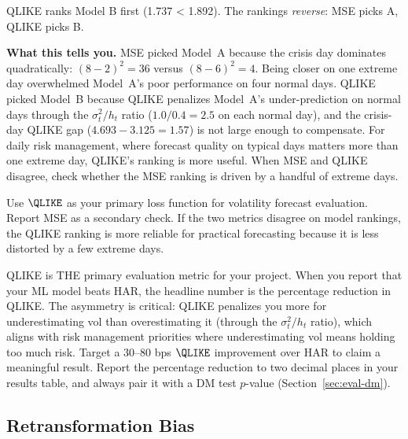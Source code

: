 \begin{workedexample}
QLIKE ranks Model B first (1.737 < 1.892).
The rankings \emph{reverse}: MSE picks A, QLIKE picks B.

\textbf{What this tells you.}
MSE picked Model~A because the crisis day dominates quadratically: $(8-2)^2 = 36$ versus $(8-6)^2 = 4$.
Being closer on one extreme day overwhelmed Model~A's poor performance on four normal days.
QLIKE picked Model~B because QLIKE penalizes Model~A's under-prediction on normal days through the $\sigma^2_t / h_t$ ratio ($1.0/0.4 = 2.5$ on each normal day), and the crisis-day QLIKE gap ($4.693 - 3.125 = 1.57$) is not large enough to compensate.
For daily risk management, where forecast quality on typical days matters more than one extreme day, QLIKE's ranking is more useful.
When MSE and QLIKE disagree, check whether the MSE ranking is driven by a handful of extreme days.
\end{workedexample}

\begin{keyidea}
Use $\QLIKE$ as your primary loss function for volatility forecast evaluation.
Report MSE as a secondary check.
If the two metrics disagree on model rankings, the QLIKE ranking is more reliable for practical forecasting because it is less distorted by a few extreme days.
\end{keyidea}

\begin{projectconnection}
QLIKE is THE primary evaluation metric for your project.
When you report that your ML model beats HAR, the headline number is the percentage reduction in QLIKE.
The asymmetry is critical: QLIKE penalizes you more for underestimating vol than overestimating it (through the $\sigma^2_t / h_t$ ratio), which aligns with risk management priorities where underestimating vol means holding too much risk.
Target a 30--80 bps $\QLIKE$ improvement over HAR to claim a meaningful result.
Report the percentage reduction to two decimal places in your results table, and always pair it with a DM test $p$-value (Section~\ref{sec:eval-dm}).
\end{projectconnection}


\subsection{Retransformation Bias}
\label{sec:eval-retransformation}

